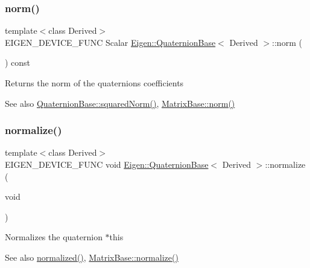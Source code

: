 \subsubsection{\texorpdfstring{norm()}{norm()}}
{\footnotesize\ttfamily template$<$class Derived$>$ \\
E\+I\+G\+E\+N\+\_\+\+D\+E\+V\+I\+C\+E\+\_\+\+F\+U\+NC Scalar \mbox{\hyperlink{class_eigen_1_1_quaternion_base}{Eigen\+::\+Quaternion\+Base}}$<$ Derived $>$\+::norm (\begin{DoxyParamCaption}{ }\end{DoxyParamCaption}) const\hspace{0.3cm}{\ttfamily [inline]}}

\begin{DoxyReturn}{Returns}
the norm of the quaternion\textquotesingle{}s coefficients 
\end{DoxyReturn}
\begin{DoxySeeAlso}{See also}
\mbox{\hyperlink{class_eigen_1_1_quaternion_base_a5370cf77843374a5adefca3f78770961}{Quaternion\+Base\+::squared\+Norm()}}, \mbox{\hyperlink{class_eigen_1_1_matrix_base_a5f6a3bc46add1f2e879ce15040e6987e}{Matrix\+Base\+::norm()}} 
\end{DoxySeeAlso}
\mbox{\label{class_eigen_1_1_quaternion_base_aa8d67d855940925f634327827aed1cad}} 
\subsubsection{\texorpdfstring{normalize()}{normalize()}}
{\footnotesize\ttfamily template$<$class Derived$>$ \\
E\+I\+G\+E\+N\+\_\+\+D\+E\+V\+I\+C\+E\+\_\+\+F\+U\+NC void \mbox{\hyperlink{class_eigen_1_1_quaternion_base}{Eigen\+::\+Quaternion\+Base}}$<$ Derived $>$\+::normalize (\begin{DoxyParamCaption}\item[{void}]{ }\end{DoxyParamCaption})\hspace{0.3cm}{\ttfamily [inline]}}

Normalizes the quaternion {\ttfamily $\ast$this} \begin{DoxySeeAlso}{See also}
\mbox{\hyperlink{class_eigen_1_1_quaternion_base_af07bcd396dd08136fe4fbbdb182da70f}{normalized()}}, \mbox{\hyperlink{class_eigen_1_1_matrix_base_a1a2dd2fd1597ee6d51098aa3bb7c86f4}{Matrix\+Base\+::normalize()}} 
\end{DoxySeeAlso}
\mbox{\label{class_eigen_1_1_quaternion_base_af07bcd396dd08136fe4fbbdb182da70f}} 
